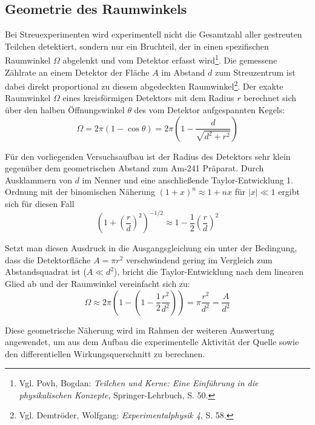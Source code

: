 \subsection{Geometrie des Raumwinkels}
Bei Streuexperimenten wird experimentell nicht die Gesamtzahl aller gestreuten Teilchen detektiert, sondern nur ein Bruchteil, der in einen spezifischen Raumwinkel $\Omega$ abgelenkt und vom Detektor erfasst wird\footnote{Vgl. Povh, Bogdan: \textit{Teilchen und Kerne: Eine Einführung in die physikalischen Konzepte}, Springer-Lehrbuch, S. 50.}. Die gemessene Zählrate an einem Detektor der Fläche $A$ im Abstand $d$ zum Streuzentrum ist dabei direkt proportional zu diesem abgedeckten Raumwinkel\footnote{Vgl. Demtröder, Wolfgang: \textit{Experimentalphysik 4}, S. 58.}.
Der exakte Raumwinkel $\Omega$ eines kreisförmigen Detektors mit dem Radius $r$ berechnet sich über den halben Öffnungswinkel $\theta$ des vom Detektor aufgespannten Kegels:
\begin{equation}
    \Omega = 2\pi \left( 1 - \cos\theta \right) = 2\pi \left( 1 - \frac{d}{\sqrt{d^2 + r^2}} \right)
\end{equation}

Für den vorliegenden Versuchsaufbau ist der Radius des Detektors sehr klein gegenüber dem geometrischen Abstand zum Am-241 Präparat. Durch Ausklammern von $d$ im Nenner und eine anschließende Taylor-Entwicklung 1. Ordnung mit der binomischen Näherung $(1+x)^n \approx 1 + nx$ für $|x| \ll 1$ ergibt sich für diesen Fall
\begin{equation}
    \left( 1 + \left(\frac{r}{d}\right)^2 \right)^{-1/2} \approx 1 - \frac{1}{2}\left(\frac{r}{d}\right)^2
\end{equation}

Setzt man diesen Ausdruck in die Ausgangsgleichung ein unter der Bedingung, dass die Detektorfläche $A = \pi r^2$ verschwindend gering im Vergleich zum Abstandsquadrat ist ($A \ll d^2$), bricht die Taylor-Entwicklung nach dem linearen Glied ab und der Raumwinkel vereinfacht sich zu:
\begin{equation}
    \Omega \approx 2\pi \left( 1 - \left( 1 - \frac{1}{2}\frac{r^2}{d^2} \right) \right) = \pi \frac{r^2}{d^2} = \frac{A}{d^2}
\end{equation}

Diese geometrische Näherung wird im Rahmen der weiteren Auswertung angewendet, um aus dem Aufbau die experimentelle Aktivität der Quelle sowie den differentiellen Wirkungsquerschnitt zu berechnen. 

